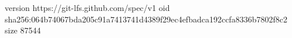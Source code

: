 version https://git-lfs.github.com/spec/v1
oid sha256:064b74067bda205c91a7413741d4389f29ec4efbadca192ccfa8336b7802f8c2
size 87544
